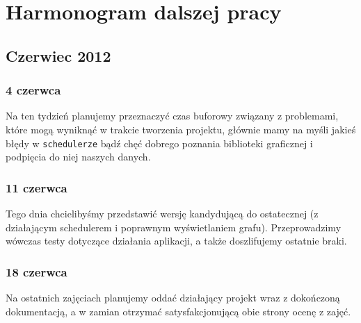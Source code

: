 \chapter{Harmonogram dalszej pracy}
\section{Czerwiec 2012}
\subsection{4 czerwca}
Na ten tydzień planujemy przeznaczyć czas buforowy związany z problemami, które mogą wyniknąć w trakcie tworzenia
projektu, głównie mamy na myśli jakieś błędy w \texttt{schedulerze} bądź chęć dobrego poznania biblioteki
graficznej i podpięcia do niej naszych danych.

\subsection{11 czerwca}
Tego dnia chcielibyśmy przedstawić wersję kandydującą do ostatecznej (z działającym schedulerem i poprawnym wyświetlaniem
grafu). Przeprowadzimy wówczas testy dotyczące działania
aplikacji, a także doszlifujemy ostatnie braki.

\subsection{18 czerwca}
Na ostatnich zajęciach planujemy oddać działający projekt wraz z dokończoną dokumentacją, a w zamian otrzymać
satysfakcjonującą obie strony ocenę z zajęć.